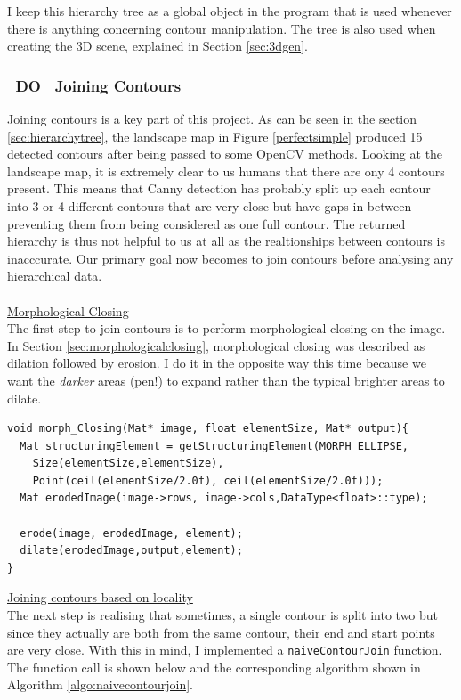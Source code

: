 \documentclass[11pt]{article}
\begin{document}
I keep this hierarchy tree as a global object in the program that is used
whenever there is anything concerning contour manipulation. The tree is
also used when creating the 3D scene, explained in Section \ref{sec:3dgen}.

\subsubsection{~DO~ Joining Contours}
Joining contours is a key part of this project. As can be seen in the
section \ref{sec:hierarchytree}, the landscape map in Figure 
\ref{perfectsimple} produced 15 detected contours after being
passed to some OpenCV methods. Looking at the landscape map, it is
extremely clear to us humans that there are ony 4 contours present.
This means that Canny detection has probably split up each contour into
3 or 4 different contours that are very close but have gaps in between
preventing them from being considered as one full contour. The returned
hierarchy is thus not helpful to us at all as the realtionships between
contours is inacccurate. Our primary goal now becomes to join contours
before analysing any hierarchical data.\\
\\
\underline{Morphological Closing}\\
The first step to join contours is to perform morphological closing on 
the image. In Section \ref{sec:morphologicalclosing}, morphological closing 
was described as dilation followed by erosion. I do it in the opposite
way this time because we want the \textit{darker} areas (pen!) to expand
rather than the typical brighter areas to dilate.

\begin{lstlisting}
void morph_Closing(Mat* image, float elementSize, Mat* output){
  Mat structuringElement = getStructuringElement(MORPH_ELLIPSE,
	Size(elementSize,elementSize),
	Point(ceil(elementSize/2.0f), ceil(elementSize/2.0f)));
  Mat erodedImage(image->rows, image->cols,DataType<float>::type);
  
  erode(image, erodedImage, element);
  dilate(erodedImage,output,element);
}
\end{lstlisting}


\underline{Joining contours based on locality}\\
The next step is realising that sometimes, a single contour is split into
two but since they actually are both from the same contour, their end and
start points are very close. With this in mind, I implemented a 
\texttt{naiveContourJoin} function. The function call is shown below and
the corresponding algorithm shown in Algorithm \ref{algo:naivecontourjoin}.
\end{document}
